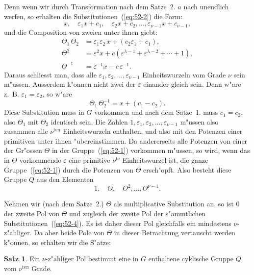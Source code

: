 \documentclass[12pt,a4paper]{article}
\theoremstyle{definition}
\newtheorem*{satz}{Satz}
\begin{document}
Denn wenn wir durch Transformation nach dem Satze~2. $a$ nach unendlich werfen, so erhalten die Substitutionen~(\ref{eq:52-2}) die Form:
\[
x, \quad \varepsilon_1 x + c_1, \quad \varepsilon_2 x + c_2, \ldots, \varepsilon_{\nu-1} x + c_{\nu-1},
\]
und die Composition von zweien unter ihnen giebt:
\begin{align*}
\Theta_1\,\Theta_2 &= \varepsilon_1\varepsilon_2\,x + (c_2\varepsilon_1 + c_1), \\
\Theta^2 &= \varepsilon^2 x + c(\varepsilon^{\lambda-1} + \varepsilon^{\lambda-2} + \cdots + 1), \\
\Theta^{-1} &= \varepsilon^{-1} x - c\,\varepsilon^{-1}.
\end{align*}
Daraus schliesst man, dass alle $\varepsilon_1, \varepsilon_2, \ldots, \varepsilon_{\nu-1}$ Einheitswurzeln vom Grade $\nu$ sein m"ussen. Ausserdem k"onnen nicht zwei der $\varepsilon$ einander gleich sein. Denn w"are z.~B. $\varepsilon_1 = \varepsilon_2$, so w"are
\[
\Theta_1\,\Theta_2^{-1} = x + (c_1 - c_2).
\]
Diese Substitution muss in $G$ vorkommen und nach dem Satze~1. muss $c_1 = c_2$, also $\Theta_1$ mit $\Theta_2$ identisch sein. Die Zahlen $1, \varepsilon_1, \varepsilon_2, \ldots, \varepsilon_{\nu-1}$ m"ussen also zusammen alle $\nu^{\text{ten}}$ Einheitswurzeln enthalten, und also mit den Potenzen einer primitiven unter ihnen "ubereinstimmen. Da andererseits alle Potenzen von einer der Gr"ossen $\Theta$ in der Gruppe~(\ref{eq:52-1}) vorkommen m"ussen, so wird, wenn das in $\Theta$ vorkommende $\varepsilon$ eine primitive $\nu^{\text{te}}$ Einheitswurzel ist, die ganze Gruppe~(\ref{eq:52-1}) durch die Potenzen von $\Theta$ ersch"opft. Also besteht diese Gruppe $Q$ aus den Elementen
\begin{equation}\label{eq:52-4}
1, \quad \Theta, \quad \Theta^2, \ldots, \Theta^{\nu-1}.
\end{equation}

Nehmen wir (nach dem Satze~2.) $\Theta$ als multiplicative Substitution an, so ist $0$ der zweite Pol von $\Theta$ und zugleich der zweite Pol der s"ammtlichen Substitutionen~(\ref{eq:52-4}). Es ist daher dieser Pol gleichfalls ein mindestens $\nu$-z"ahliger. Da aber beide Pole von $\Theta$ in dieser Betrachtung vertauscht werden k"onnen, so erhalten wir die S"atze:

\begin{satz}
Ein $\nu$-z"ahliger Pol bestimmt eine in $G$ enthaltene cyklische Gruppe $Q$ vom $\nu^{\text{ten}}$ Grade.
\end{satz}
\end{document}
